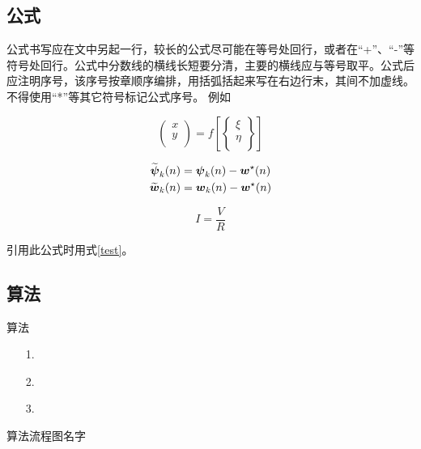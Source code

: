 \subsection{公式}
公式书写应在文中另起一行，较长的公式尽可能在等号处回行，或者在“+”、“-”等符号处回行。公式中分数线的横线长短要分清，主要的横线应与等号取平。公式后应注明序号，该序号按章顺序编排，用括弧括起来写在右边行末，其间不加虚线。不得使用“*”等其它符号标记公式序号。   
例如

\begin{equation}\label{transformation}
	\left(\begin{array}{l}
		x \\
		y \\
	\end{array}\right)=f\left[\left\{\begin{array}{l}
		\xi \\
		\eta \\
	\end{array}\right\}\right]
\end{equation}

\begin{align}
	\label{eq:error1}
	{\widetilde{\boldsymbol\psi}}_k(n) &= {\boldsymbol \psi}_k(n) - {\boldsymbol w}^\star(n) \\
	\label{eq:error2}
	{\widetilde{\boldsymbol w}}_k(n) &= {\boldsymbol w}_k(n) - {\boldsymbol w}^\star(n)
\end{align}


\begin{equation}\label{test}
	I=\frac VR
\end{equation}

引用此公式时用式\eqref{test}。

\subsection{算法}

算法\cite{cottrell2009}
\begin{enumerate}
	\item[1.] 
	\item[2.] 
	\item[3.] 
\end{enumerate}


\begin{algorithm}[!ht]
	\caption{算法流程图名字} %
	\label{algorithm}
	\begin{algorithmic}[!h]
		\EndFor
		\EndFor
		\EndFor
	\end{algorithmic}
\end{algorithm}

